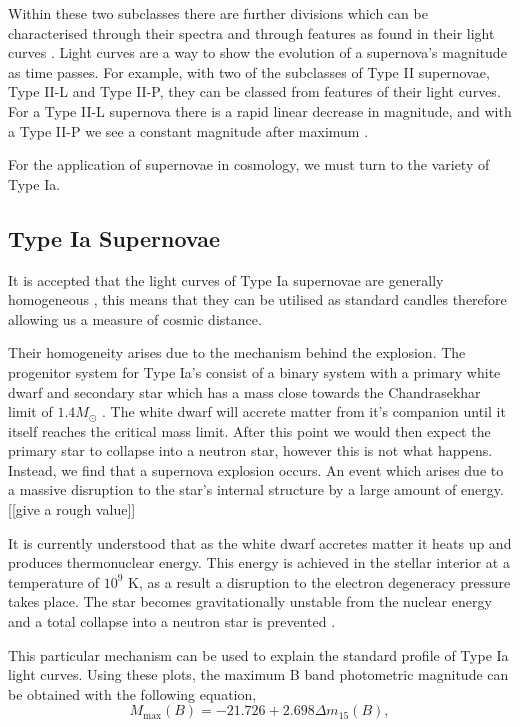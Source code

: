 \documentclass[twocolumn]{revtex4}
\begin{document}
Within these two subclasses there are further divisions which can be characterised through their spectra and through features as found in their light curves \cite{obs_phys_class_sn}. Light curves are a way to show the evolution of a supernova's magnitude as time passes. For example, with two of the subclasses of Type II supernovae, Type II-L and Type II-P, they can be classed from features of their light curves. For a Type II-L supernova there is a rapid linear decrease in magnitude, and with a Type II-P we see a constant magnitude after maximum \cite{mod_ast}.

For the application of supernovae in cosmology, we must turn to the variety of Type Ia.

\vspace{-3ex}
\subsection{Type Ia Supernovae}
\vspace{-2ex}
It is accepted that the light curves of Type Ia supernovae are generally homogeneous \cite{posn}, this means that they can be utilised as standard candles therefore allowing us a measure of cosmic distance. 

Their homogeneity arises due to the mechanism behind the explosion. The progenitor system for Type Ia's consist of a binary system with a primary white dwarf and secondary star which has a mass close towards the Chandrasekhar limit of $1.4 M_{\odot}$ \cite{mod_ast, posn}. The white dwarf will accrete matter from it's companion until it itself reaches the critical mass limit. After this point we would then expect the primary star to collapse into a neutron star, however this is not what happens. Instead, we find that a supernova explosion occurs. An event which arises due to a massive disruption to the star's internal structure by a large amount of energy. [[give a rough value]]

It is currently understood that as the white dwarf accretes matter it heats up and produces thermonuclear energy. This energy is achieved in the stellar interior at a temperature of $10^9$ K, as a result a disruption to the electron degeneracy pressure takes place. The star becomes gravitationally unstable from the nuclear energy and a total collapse into a neutron star is prevented \cite{longair, posn}.

This particular mechanism can be used to explain the standard profile of Type Ia light curves. Using these plots, the maximum B band photometric magnitude can be obtained with the following equation,
\begin{equation}
M_{\max}(B)=-21.726+2.698\Delta m_{15}(B),
\end{equation}
\end{document}
